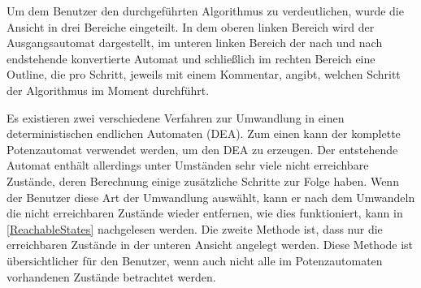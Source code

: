 Um dem Benutzer den durchgeführten Algorithmus zu verdeutlichen, wurde die
Ansicht in drei Bereiche eingeteilt. In dem oberen linken Bereich wird der
Ausgangsautomat dargestellt, im unteren linken Bereich der nach und nach
endstehende konvertierte Automat und schließlich im rechten Bereich eine
Outline, die pro Schritt, jeweils mit einem Kommentar, angibt, welchen Schritt
der Algorithmus im Moment durchführt.\vspace{10pt}

Es existieren zwei verschiedene Verfahren zur Umwandlung in einen
deterministischen endlichen Automaten (DEA). Zum einen kann der komplette
Potenzautomat verwendet werden, um den DEA zu erzeugen. Der entstehende Automat
enthält allerdings unter Umständen sehr viele nicht erreichbare Zustände, deren
Berechnung einige zusätzliche Schritte zur Folge haben. Wenn der Benutzer diese
Art der Umwandlung auswählt, kann er nach dem Umwandeln die nicht erreichbaren
Zustände wieder entfernen, wie dies funktioniert, kann in \ref{ReachableStates}
nachgelesen werden. Die zweite Methode ist, dass nur die erreichbaren Zustände
in der unteren Ansicht angelegt werden. Diese Methode ist übersichtlicher für
den Benutzer, wenn auch nicht alle im Potenzautomaten vorhandenen Zustände
betrachtet werden.\vspace{10pt}
